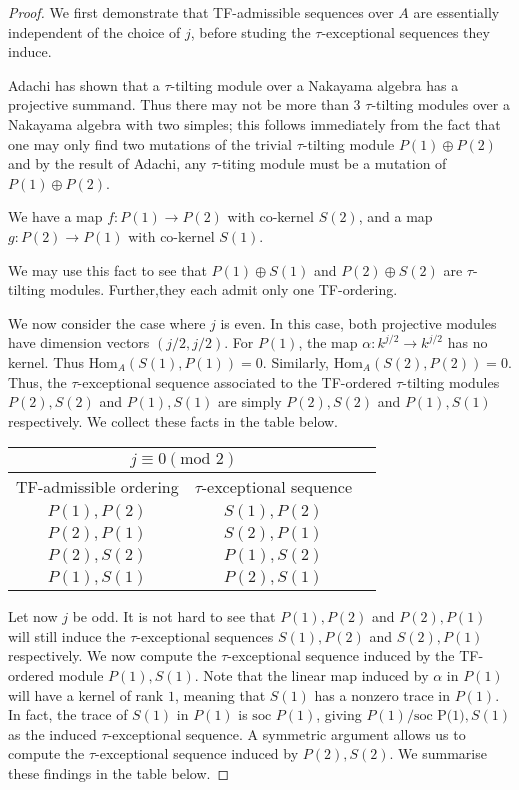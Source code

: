 \documentclass[]{article}
\theoremstyle{definition}
\newcommand{\tu}{\ensuremath{\tau}}
\begin{document}
\begin{proof}
	We first demonstrate that TF-admissible sequences over $A$ are essentially independent of the choice of $j$, before studing the \tu-exceptional sequences they induce.
	
	
	Adachi has shown that a \tu-tilting module over a Nakayama algebra has a projective summand. Thus there may not be more than $3$ \tu-tilting modules over a Nakayama algebra with two simples; this follows immediately from the fact that one may only find two mutations of the trivial \tu-tilting module $P(1) \oplus P(2)$ and by the result of Adachi, any \tu-titing module must be a mutation of $P(1) \oplus P(2)$.
	
	We have a map $f:P(1) \to P(2)$ with co-kernel $S(2)$, and a map $g:P(2) \to P(1)$ with co-kernel $S(1)$.
	
	We may use this fact to see that $P(1) \oplus S(1)$ and $P(2) \oplus S(2)$ are \tu-tilting modules. Further,they each admit only one TF-ordering. 
	
	We now consider the case where $j$ is even. In this case, both projective modules have dimension vectors $(j/2,j/2)$. For $P(1)$, the map $\alpha:k^{j/2} \to k^{j/2}$ has no kernel. Thus $\text{Hom}_A(S(1),P(1)) = 0$. Similarly, $\text{Hom}_A(S(2),P(2)) = 0$. Thus, the \tu-exceptional sequence associated to the TF-ordered \tu-tilting modules $P(2),S(2)$ and $P(1),S(1)$ are simply $P(2),S(2)$ and $P(1),S(1)$ respectively. We collect these facts in the table below. 
	
	
		\begin{center}
			
		\begin{tabular}{ |c|c|c| } 
			\hline
			\multicolumn{2}{|c|}{$j \equiv 0 (\text{mod }2)$} \\
			\hline
			TF-admissible ordering & $\tau$-exceptional sequence \\
			\hline
			$P(1),P(2)$ & $S(1),P(2)$ \\ 
			$P(2),P(1)$ & $S(2),P(1)$ \\ 
			$P(2),S(2)$ & $P(1),S(2)$\\ 
			$P(1),S(1)$ & $P(2),S(1)$ \\
			\hline
		\end{tabular}
	\end{center}

	Let now $j$ be odd. It is not hard to see that $P(1),P(2)$ and $P(2),P(1)$ will still induce the \tu-exceptional sequences $S(1),P(2)$ and $S(2),P(1)$ respectively. We now compute the \tu-exceptional sequence induced by the TF-ordered module $P(1),S(1)$. Note that the linear map induced by $\alpha$ in $P(1)$ will have a kernel of rank $1$, meaning that $S(1)$ has a nonzero trace in $P(1)$. In fact, the trace of $S(1)$ in $P(1)$ is $\text{soc } P(1)$, giving $P(1)/\text{soc P(1)},S(1)$ as the induced \tu-exceptional sequence. A symmetric argument allows us to compute the \tu-exceptional sequence induced by $P(2),S(2)$. We summarise these findings in the table below.
	

\end{proof}
\end{document}
